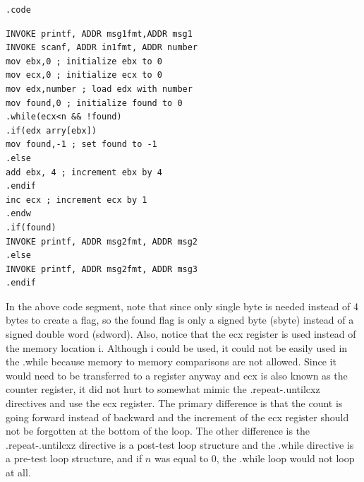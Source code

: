 \documentclass[10pt]{book}
\begin{document}
\begin{verbatim}
.code
\end{verbatim}
\begin{verbatim}
INVOKE printf, ADDR msg1fmt,ADDR msg1
INVOKE scanf, ADDR in1fmt, ADDR number
mov ebx,0 ; initialize ebx to 0
mov ecx,0 ; initialize ecx to 0
mov edx,number ; load edx with number
mov found,0 ; initialize found to 0
.while(ecx<n && !found)
.if(edx arry[ebx])
mov found,-1 ; set found to -1
.else
add ebx, 4 ; increment ebx by 4
.endif
inc ecx ; increment ecx by 1
.endw
.if(found)
INVOKE printf, ADDR msg2fmt, ADDR msg2
.else
INVOKE printf, ADDR msg2fmt, ADDR msg3
.endif
\end{verbatim}

In the above code segment, note that since only single byte is needed instead of 4 bytes to create a flag, so the found flag is only a signed byte (sbyte) instead of a signed double word (sdword). Also, notice that the ecx register is used instead of the memory location i. Although i could be used, it could not be easily used in the .while because memory to memory comparisons are not allowed. Since it would need to be transferred to a register anyway and ecx is also known as the counter register, it did not hurt to somewhat mimic the .repeat-.untilcxz directives and use the ecx register. The primary difference is that the count is going forward instead of backward and the increment of the ecx register should not be forgotten at the bottom of the loop. The other difference is the .repeat-.untilcxz directive is a post-test loop structure and the .while directive is a pre-test loop structure, and if $n$ was equal to 0, the .while loop would not loop at all.
\end{document}
